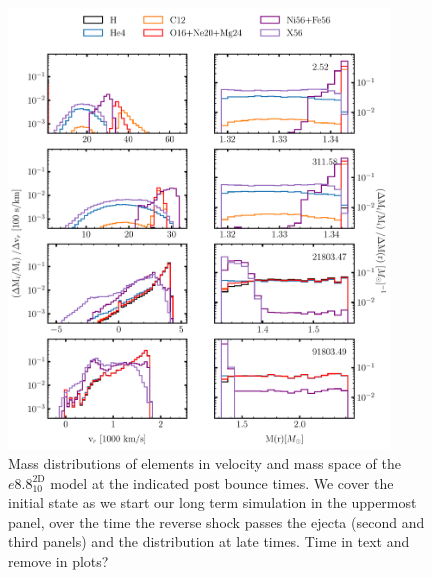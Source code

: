 \documentclass[fleqn,usenatbib]{mnras}
\newcommand{\COM}[1]{{\color{red}#1}}
\begin{document}
\begin{figure}
 \centering
 \includegraphics[width=0.9\textwidth]{pic/e8_10_mvr_mas_4times.pdf}
 \caption{Mass distributions of elements in velocity and mass space  of the $e8.8^{\mathrm{2D}}_{10}$ model at the indicated post bounce times. We cover the initial state as we start our long term simulation in the uppermost panel, over the time the reverse shock passes the ejecta (second and third panels) and the distribution at late times. \COM{Time in text and remove in plots?}}
 \label{fig:e8 massDis 4times}
\end{figure}

\end{document}
